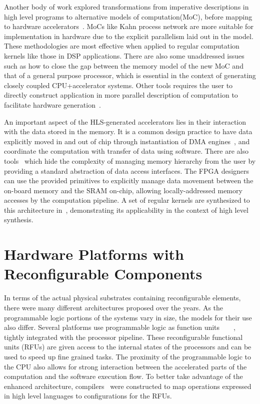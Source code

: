 Another body of work explored transformations from imperative descriptions in
high level programs to alternative models of computation(MoC), before mapping to
hardware accelerators~\cite{mat2pn}\cite{c2stream}. MoCs like Kahn process network
are more suitable for implementation in hardware due to the explicit parallelism laid out
in the model. These methodologies are most effective when applied to regular computation kernels
like those in DSP applications. There are also some unaddressed issues 
such as how to close the gap
between the memory model of the new MoC and that of a
general purpose processor, which is essential in the context of
generating closely coupled CPU+accelerator systems.
Other tools requires the user to directly construct application
in more parallel description of computation to facilitate hardware
generation~\cite{hlfp}\cite{5226333}\cite{MARC}. 

An important aspect of the HLS-generated accelerators lies in their interaction
with the data stored in the memory.
It is a common design practice to have data explicitly moved in and out of chip through
instantiation of DMA engines~\cite{vivado_hls:appnoteMMult}, and coordinate the computation with transfer of data
using software. There are also tools~\cite{coram} which hide the 
complexity of managing memory
hierarchy from the user by providing a standard abstraction
of data access interfaces. The FPGA designers can use the
provided primitives to explicitly manage data movement between
the on-board memory and the SRAM on-chip, allowing
locally-addressed memory accesses by the computation pipeline.
A set of regular kernels are synthesized to this architecture
in~\cite{c2coram}, demonstrating its applicability in the context of high level
synthesis.

\section{Hardware Platforms with Reconfigurable Components}
\label{hetero}
In terms of the actual physical substrates containing reconfigurable elements, 
there were many different architectures proposed over the years.  As the
programmable logic portions of the systems vary in size, the models for their use also
differ. Several platforms use programmable logic as function units~\cite{Carrillo:2001:ERU:360276.360328}~\cite{1266409}~\cite{1240967}~\cite{717456}, tightly integrated
with the processor pipeline. These reconfigurable functional units (RFUs) are given access
to the internal states of the processors and can be used to speed up fine grained 
tasks. The proximity of the programmable logic to the CPU also allows for strong interaction
between the accelerated parts of the computation and the software execution flow. 
To better take advantage of the enhanced architecture, compilers~\cite{10.1109/FPGA.2000.2} were constructed to map operations expressed in high level languages to configurations for the RFUs.

